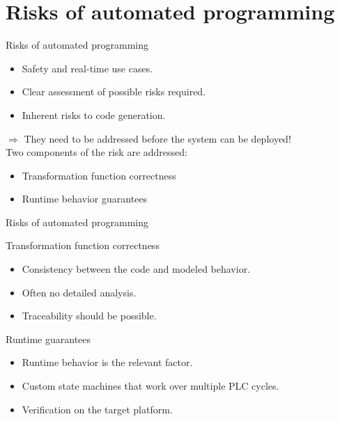 \documentclass[18pt]{beamer}
\begin{document}
\section{Risks of automated programming}

\begin{frame}{Risks of automated programming}
\begin{itemize}
    \item Safety and real-time use cases.
    \item Clear assessment of possible risks required.
    \item Inherent risks to code generation.
\end{itemize}
$\Rightarrow$ They need to be addressed before the system can be deployed!
\pause
\\
Two components of the risk are addressed:
\begin{itemize}
    \item Transformation function correctness
    \item Runtime behavior guarantees
\end{itemize}
\end{frame}

\begin{frame}{Risks of automated programming}

\begin{block}{Transformation function correctness}
	\begin{itemize}
		\item Consistency between the code and modeled behavior.
        \item Often no detailed analysis.
        \item Traceability should be possible.
	\end{itemize}
\end{block}
\pause
\begin{block}{Runtime guarantees}
    \begin{itemize}
        \item Runtime behavior is the relevant factor.
        \item Custom state machines that work over multiple PLC cycles.
        \item Verification on the target platform.
    \end{itemize}
\end{block}
\end{frame}
\end{document}
